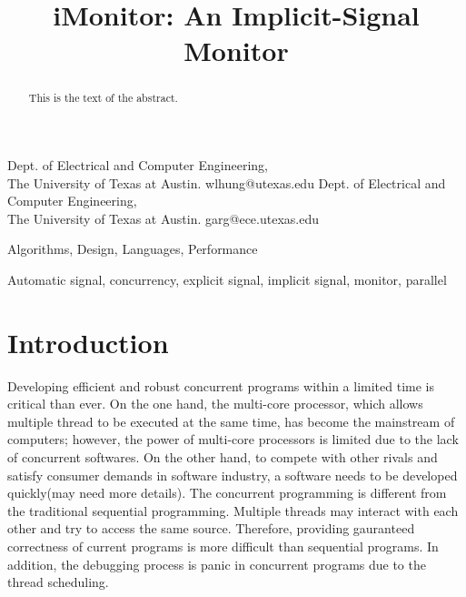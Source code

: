 \documentclass[preprint]{sigplanconf}
\begin{document}
\copyrightdata{[to be supplied]} 


\title{iMonitor: An Implicit-Signal Monitor}
\subtitle{}

{Dept. of Electrical and Computer Engineering, \\ 
  The University of Texas at Austin.}
{wlhung@utexas.edu}
{Dept. of Electrical and Computer Engineering, \\ 
  The University of Texas at Austin.}
{garg@ece.utexas.edu}

\maketitle

\begin{abstract}
  This is the text of the abstract.
\end{abstract}


\terms
Algorithms, Design, Languages, Performance

\keywords
Automatic signal, concurrency, explicit signal, implicit signal,
monitor, parallel

\section{Introduction} \label{sec:intro}

Developing efficient and robust concurrent programs within a limited time is 
critical than ever. On the one hand, the multi-core processor, which allows 
multiple thread to be executed at the same time, has become the mainstream of 
computers; however, the power of multi-core processors is limited due to the 
lack of concurrent softwares. On the other hand, to compete with other rivals
and satisfy consumer demands in software industry, a software needs to be 
developed quickly(may need more details). The concurrent programming is 
different from the traditional sequential programming. Multiple threads may 
interact with each other and try to access the same source. Therefore, providing
gauranteed correctness of current programs is more difficult than sequential 
programs. In addition, the debugging process is panic in concurrent 
programs due to the thread scheduling. 
\end{document}
